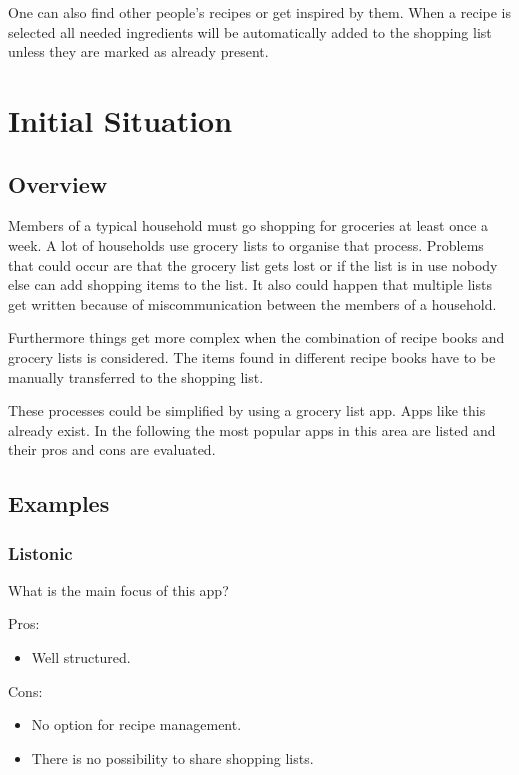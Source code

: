 \documentclass[12pt]{article}
\theoremstyle{definition}
\begin{document}
One can also find other people's recipes or get inspired by them. When a recipe is selected all needed ingredients will be automatically added to the shopping list unless they are marked as already present. 

\pagebreak

\section{Initial Situation}

\subsection{Overview}

Members of a typical household must go shopping for groceries at least once a week. A lot of households use grocery lists to organise that process. Problems that could occur are that the grocery list gets lost or if the list is in use nobody else can add shopping items to the list. It also could happen that multiple lists get written because of miscommunication between the members of a household.

Furthermore things get more complex when the combination of recipe books and grocery lists is considered. The items found in different recipe books have to be manually transferred to the shopping list. 

These processes could be simplified by using a grocery list app. Apps like this already exist. In the following the most popular apps in this area are listed and their pros and cons are evaluated.

\subsection{Examples}
\subsubsection{Listonic}
What is the main focus of this app?

Pros:

\begin{itemize}
\item Well structured.
\end{itemize}
Cons:
\begin{itemize}
\item No option for recipe management.
\item There is no possibility to share shopping lists.
\end{itemize}
\end{document}
